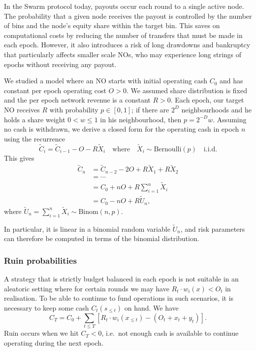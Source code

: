 In the Swarm protocol today, payouts occur each round to a single active node.
%
The probability that a given node receives the payout is controlled by the number of bins and the node's equity share within the target bin.
%
This saves on computational costs by reducing the number of transfers that must be made in each epoch.
%
However, it also introduces a risk of long drawdowns and bankruptcy that particularly affects smaller scale NOs, who may experience long strings of epochs without receiving any payout.

We studied a model where an NO starts with initial operating cash $C_0$ and has constant per epoch operating cost $O>0$.
%
We assumed share distribution is fixed and the per epoch network revenue is a constant $R>0$.
%
Each epoch, our target NO receives $R$ with probability $p\in[0,1]$; if there are $2^D$ neighbourhoods and he holds a share weight $0<w\leq 1$ in his neighbourhood, then $p=2^{-D}w$.
%
Assuming no cash is withdrawn, we derive a closed form for the operating cash in epoch $n$ using the recurrence
%
\[
  \tilde{C}_i = \tilde C_{i-1} - O - R\tilde{X}_i \quad \text{where} \quad \tilde{X}_i \sim \mathrm{Bernoulli}(p) \quad \text{i.i.d.}
\]
This gives 
\begin{align*}
  \tilde C_n &= \tilde C_{n-2} - 2O + R\tilde X_1 + R\tilde X_2 \\
  & =\cdots \\
  &= C_0 + nO + R\sum_{i=1}^n \tilde X_i \\
  &= C_0 - nO + R\tilde U_n,
\end{align*}
where $\tilde U_n = \sum_{i=1}^n \tilde X_i \sim \mathrm{Binom}(n,p)$.

In particular, it is linear in a binomial random variable $\tilde U_n$, and risk parameters can therefore be computed in terms of the binomial distribution.

\subsubsection{Ruin probabilities}


A strategy that is strictly budget balanced in each epoch is not suitable in an aleatoric setting where for certain rounds we may have $R_t\cdot w_i(x) < O_t$ in realisation.
%
To be able to continue to fund operations in such scenarios, it is necessary to keep some cash $C_t(s_{\leq t})$ on hand.
%
We have
\[
  C_T = C_0 + \sum_{t\leq T} \left[ R_t\cdot w_i(x_{\leq t}) - (O_t + x_t + y_t) \right].
\]
Ruin occurs when we hit $C_T < 0$, i.e.~not enough cash is available to continue operating during the next epoch.

